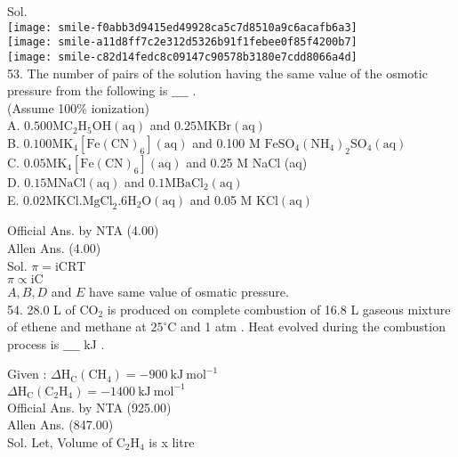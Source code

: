 \documentclass[10pt]{article}
\begin{document}
Sol.\\
\texttt{[image: smile-f0abb3d9415ed49928ca5c7d8510a9c6acafb6a3]}\\
\texttt{[image: smile-a11d8ff7c2e312d5326b91f1febee0f85f4200b7]}\\
\texttt{[image: smile-c82d14fedc8c09147c90578b3180e7cdd8066a4d]}\\
53. The number of pairs of the solution having the same value of the osmotic pressure from the following is \(\_\_\_\_\) .\\
(Assume 100\% ionization)\\
A. \(0.500 \mathrm{M} \mathrm{C}_{2} \mathrm{H}_{5} \mathrm{OH}(\mathrm{aq})\) and \(0.25 \mathrm{M} \mathrm{KBr}(\mathrm{aq})\)\\
B. \(0.100 \mathrm{M} \mathrm{K}_{4}\left[\mathrm{Fe}(\mathrm{CN})_{6}\right](\mathrm{aq})\) and 0.100 M \(\mathrm{FeSO}_{4}\left(\mathrm{NH}_{4}\right)_{2} \mathrm{SO}_{4}(\mathrm{aq})\)\\
C. \(0.05 \mathrm{M} \mathrm{K}_{4}\left[\mathrm{Fe}(\mathrm{CN})_{6}\right](\mathrm{aq})\) and 0.25 M NaCl (aq)\\
D. \(0.15 \mathrm{M} \mathrm{NaCl}(\mathrm{aq})\) and \(0.1 \mathrm{M} \mathrm{BaCl}_{2}(\mathrm{aq})\)\\
E. \(0.02 \mathrm{M} \mathrm{KCl} . \mathrm{MgCl}_{2} .6 \mathrm{H}_{2} \mathrm{O}(\mathrm{aq})\) and 0.05 M \(\mathrm{KCl}(\mathrm{aq})\)

Official Ans. by NTA (4.00)\\
Allen Ans. (4.00)\\
Sol. \(\pi=\mathrm{iCRT}\)\\
\(\pi \propto \mathrm{iC}\)\\
\(A, B, D\) and \(E\) have same value of osmatic pressure.\\
54. 28.0 L of \(\mathrm{CO}_{2}\) is produced on complete combustion of 16.8 L gaseous mixture of ethene and methane at \(25^{\circ} \mathrm{C}\) and 1 atm . Heat evolved during the combustion process is \(\_\_\_\_\) kJ .

Given : \(\Delta \mathrm{H}_{\mathrm{C}}\left(\mathrm{CH}_{4}\right)=-900 \mathrm{~kJ} \mathrm{~mol}^{-1}\)\\
\(\Delta \mathrm{H}_{\mathrm{C}}\left(\mathrm{C}_{2} \mathrm{H}_{4}\right)=-1400 \mathrm{~kJ} \mathrm{~mol}^{-1}\)\\
Official Ans. by NTA (925.00)\\
Allen Ans. (847.00)\\
Sol. Let, Volume of \(\mathrm{C}_{2} \mathrm{H}_{4}\) is x litre
\end{document}
